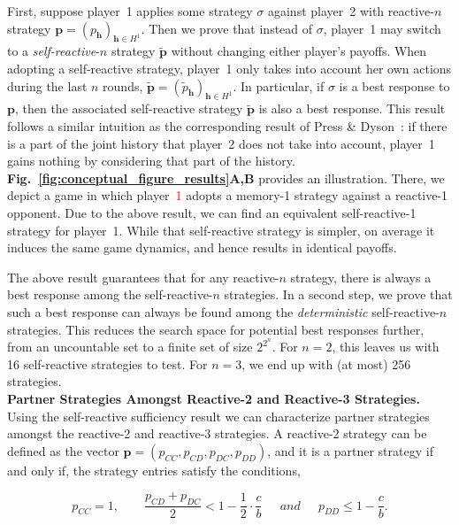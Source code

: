 \documentclass[11pt]{article}
\newcommand{\figref}[1]{{\textbf{Fig.~\ref{#1}}}}
\begin{document}
First, suppose player~1 applies some strategy $\sigma$ against player~2 with reactive-$n$ strategy $\mathbf{p}\!=\!(p_\mathbf{h})_{\mathbf{h}\in H^1}$. 
Then we prove that instead of $\sigma$, player~1 may switch to a {\it self-reactive}-$n$ strategy $\mathbf{\tilde{p}}$ without changing either player's payoffs. 
When adopting a self-reactive strategy, player~1 only takes into account her own actions during the last $n$ rounds, 
$\mathbf{\tilde{p}} \!=\! (\tilde{p}_\mathbf{h})_{\mathbf{h} \in H^1}$.
In particular, if $\sigma$ is a best response to $\mathbf{p}$, then the associated self-reactive strategy $\mathbf{\tilde p}$ is also a best response. 
This result follows a similar intuition as the corresponding result of Press \& Dyson~\cite{press:PNAS:2012}: 
if there is a part of the joint history that player~2 does not take into account, player~1 gains nothing by considering that part of the history. 
\figref{fig:conceptual_figure_results}\textbf{A,B} provides an illustration.  
There, we depict a game in which player~\textcolor{red}{1} %
adopts a memory-1 strategy against a reactive-1 opponent. 
Due to the above result, we can find an equivalent self-reactive-1 strategy for player~1. 
While that self-reactive strategy is simpler, on average it induces the same game dynamics, and hence results in identical payoffs. 

The above result guarantees that for any reactive-$n$ strategy, there is always a best response among the self-reactive-$n$ strategies. 
In a second step, we prove that such a best response can always be found among the {\it deterministic} self-reactive-$n$ strategies. 
This reduces the search space for potential best responses further, from an uncountable set to a finite set of size $2^{2^n}$. 
For $n\!=\!2$, this leaves us with 16 self-reactive strategies to test. 
For $n\!=\!3$, we end up with (at most) 256 strategies.\\




\noindent
\textbf{Partner Strategies Amongst Reactive-2 and Reactive-3 Strategies.}
Using the self-reactive sufficiency result we can characterize partner
strategies amongst the reactive-2 and reactive-3 strategies. A reactive-2
strategy can be defined as the vector $\mathbf{p} = (p_{CC}, p_{CD}, p_{DC},
p_{DD})$, and it is a partner strategy if and only if, the strategy entries
satisfy the conditions,

\begin{equation}\label{eq:two_bit_conditions}
  p_{CC} = 1, \qquad \displaystyle \frac{p_{CD} + p_{DC}}{2} < 1 - \frac{1}{2} \cdot \frac{c}{b} \quad ~~and~~ \quad \displaystyle p_{DD} \leq 1\!-\! \frac{c}{b}.
\end{equation}
\end{document}
